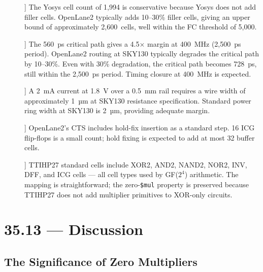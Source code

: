 \begin{description}
  \item[\textbf{OQ-1 (Cell inflation):]{}] The Yosys cell count of 1,994
        is conservative because Yosys does not add filler cells.
        OpenLane2 typically adds 10--30\% filler cells, giving an upper bound
        of approximately 2,600~cells, well within the FC threshold of 5,000.

  \item[\textbf{OQ-2 (Timing closure):]{}] The 560~ps critical path gives
        a 4.5\(\times\) margin at 400~MHz (2,500~ps period).
        OpenLane2 routing at SKY130 typically degrades the critical path by
        10--30\%.
        Even with 30\% degradation, the critical path becomes 728~ps,
        still within the 2,500~ps period.
        Timing closure at 400~MHz is expected.

  \item[\textbf{OQ-3 (Power rail):]{}] A 2~mA current at 1.8~V over a
        0.5~mm rail requires a wire width of approximately 1~µm at SKY130
        resistance specification.
        Standard power ring width at SKY130 is 2~µm, providing adequate margin.

  \item[\textbf{OQ-4 (ICG hold):]{}] OpenLane2's CTS includes hold-fix
        insertion as a standard step.
        16 ICG flip-flops is a small count; hold fixing is expected to add
        at most 32 buffer cells.

  \item[\textbf{OQ-5 (TTIHP27 compatibility):]{}] TTIHP27 standard cells
        include XOR2, AND2, NAND2, NOR2, INV, DFF, and ICG cells --- all
        cell types used by GF(\(2^4\)) arithmetic.
        The mapping is straightforward; the zero-\texttt{\$mul} property
        is preserved because TTIHP27 does not add multiplier primitives
        to XOR-only circuits.
\end{description}

\section{35.13 --- Discussion}
\label{sec:glava35-discussion}

\subsection{The Significance of Zero Multipliers}

